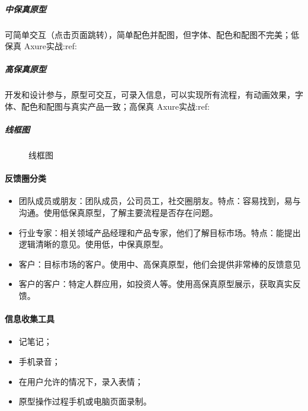 \documentclass[letterpaper,11pt,english]{sphinxmanual}
\begin{document}
\subparagraph{中保真原型}
\label{\detokenize{chapter_knowledge/prototype_design:id8}}
可简单交互（点击页面跳转），简单配色并配图，但字体、配色和配图不完美；低保真
Axure实战:ref:


\subparagraph{高保真原型}
\label{\detokenize{chapter_knowledge/prototype_design:id9}}
开发和设计参与，原型可交互，可录入信息，可以实现所有流程，有动画效果，字体、配色和配图与真实产品一致；高保真
Axure实战:ref:


\subparagraph{线框图}
\label{\detokenize{chapter_knowledge/prototype_design:id10}}
\begin{figure}[H]
\centering
\capstart

\noindent{}
\caption{线框图\sphinxfootnotemark[534]}\label{\detokenize{chapter_knowledge/prototype_design:id22}}\end{figure}
%
\begin{footnotetext}[534]\sphinxAtStartFootnote
{}
%
\end{footnotetext}\ignorespaces 

\paragraph{反馈圈分类}
\label{\detokenize{chapter_knowledge/prototype_design:id11}}\begin{itemize}
\item {} 
团队成员或朋友：团队成员，公司员工，社交圈朋友。特点：容易找到，易与沟通。使用低保真原型，了解主要流程是否存在问题。

\item {} 
行业专家：相关领域产品经理和产品专家，他们了解目标市场。特点：能提出逻辑清晰的意见。使用低，中保真原型。

\item {} 
客户：目标市场的客户。使用中、高保真原型，他们会提供非常棒的反馈意见

\item {} 
客户的客户：特定人群应用，如投资人等。使用高保真原型展示，获取真实反馈。

\end{itemize}


\paragraph{信息收集工具}
\label{\detokenize{chapter_knowledge/prototype_design:id12}}\begin{itemize}
\item {} 
记笔记；

\item {} 
手机录音；

\item {} 
在用户允许的情况下，录入表情；

\item {} 
原型操作过程手机或电脑页面录制。

\end{itemize}
\end{document}
